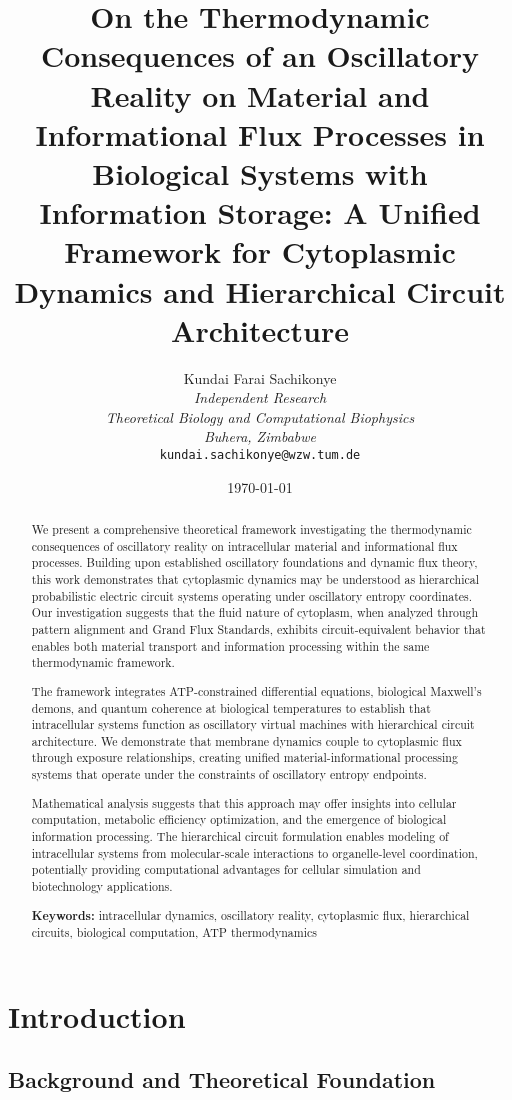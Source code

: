 \documentclass[12pt,a4paper]{article}
\title{\textbf{On the Thermodynamic Consequences of an Oscillatory Reality on Material and Informational Flux Processes in Biological Systems with Information Storage: A Unified Framework for Cytoplasmic Dynamics and Hierarchical Circuit Architecture}}
\author{
Kundai Farai Sachikonye\\
\textit{Independent Research}\\
\textit{Theoretical Biology and Computational Biophysics}\\
\textit{Buhera, Zimbabwe}\\
\texttt{kundai.sachikonye@wzw.tum.de}
}
\date{\today}
\begin{document}
\maketitle

\begin{abstract}
We present a comprehensive theoretical framework investigating the thermodynamic consequences of oscillatory reality on intracellular material and informational flux processes. Building upon established oscillatory foundations and dynamic flux theory, this work demonstrates that cytoplasmic dynamics may be understood as hierarchical probabilistic electric circuit systems operating under oscillatory entropy coordinates. Our investigation suggests that the fluid nature of cytoplasm, when analyzed through pattern alignment and Grand Flux Standards, exhibits circuit-equivalent behavior that enables both material transport and information processing within the same thermodynamic framework.

The framework integrates ATP-constrained differential equations, biological Maxwell's demons, and quantum coherence at biological temperatures to establish that intracellular systems function as oscillatory virtual machines with hierarchical circuit architecture. We demonstrate that membrane dynamics couple to cytoplasmic flux through exposure relationships, creating unified material-informational processing systems that operate under the constraints of oscillatory entropy endpoints.

Mathematical analysis suggests that this approach may offer insights into cellular computation, metabolic efficiency optimization, and the emergence of biological information processing. The hierarchical circuit formulation enables modeling of intracellular systems from molecular-scale interactions to organelle-level coordination, potentially providing computational advantages for cellular simulation and biotechnology applications.

\textbf{Keywords:} intracellular dynamics, oscillatory reality, cytoplasmic flux, hierarchical circuits, biological computation, ATP thermodynamics
\end{abstract}

\section{Introduction}

\subsection{Background and Theoretical Foundation}
\end{document}
